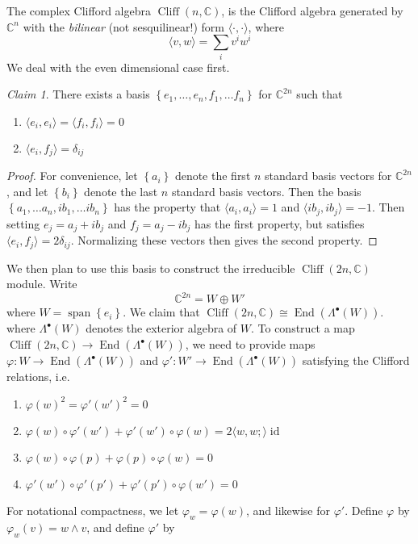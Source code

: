 \documentclass[psamsfonts]{amsart}
\theoremstyle{definition}
\theoremstyle{remark}
\newtheorem*{claim}{Claim}
\newcommand{\C}{\mathbb{C}}
\newcommand{\set}[1]{\left\lbrace #1 \right\rbrace}
\DeclareMathOperator{\id}{id}
\DeclareMathOperator{\End}{End}
\DeclareMathOperator{\Cliff}{Cliff}
\DeclareMathOperator{\spn}{span}
\begin{document}
The complex Clifford algebra $\Cliff(n,\C)$, is the Clifford algebra generated by $\C^n$ with the \emph{bilinear} (not sesquilinear!) form $\langle \cdot, \cdot \rangle$, where
\[
\langle v,w \rangle = \sum_i v^iw^i
\]
We deal with the even dimensional case first.
%
\begin{claim}
There exists a basis $\set{e_1, \ldots, e_n, f_1, \ldots f_n}$ for $\C^{2n}$ such that 
\begin{enumerate}
\item $\langle e_i, e_i \rangle = \langle f_i, f_i \rangle = 0$ 
\item $\langle e_i, f_j \rangle = \delta_{ij}$
\end{enumerate}
\end{claim}
%
\begin{proof}
For convenience, let $\set{a_i}$ denote the first $n$ standard basis vectors for $\C^{2n}$, and let $\set{b_i}$ denote the last $n$ standard basis vectors. Then the basis $\set{a_1, \ldots a_n, ib_1, \ldots ib_n}$ has the property that $\langle a_i, a_i \rangle = 1$ and $\langle ib_j, ib_j \rangle = -1$. Then setting $e_j = a_j + ib_j$ and $f_j = a_j - ib_j$ has the first property, but satisfies $\langle e_i, f_j \rangle = 2\delta_{ij}$. Normalizing these vectors then gives the second property.
\end{proof}
%
We then plan to use this basis to construct the irreducible $\Cliff(2n, \C)$ module. Write 
\[
\C^{2n} = W \oplus W'
\]
where $W = \spn\set{e_i}$. We claim that $\Cliff(2n, \C) \cong \End(\Lambda^\bullet(W))$. where $\Lambda^\bullet(W)$ denotes the exterior algebra of $W$. To construct a map $\Cliff(2n, \C) \to \End(\Lambda^\bullet(W))$, we need to provide maps $\varphi : W \to \End(\Lambda^\bullet(W))$ and $\varphi' : W' \to \End(\Lambda^\bullet(W))$ satisfying the Clifford relations, i.e.
%
\begin{enumerate}
\item $\varphi(w)^2 = \varphi'(w')^2 = 0$
\item $\varphi(w) \circ \varphi'(w') + \varphi'(w') \circ \varphi(w) = 2\langle w,w; \rangle\id $
\item $\varphi(w) \circ \varphi(p) + \varphi(p) \circ \varphi(w) = 0 $
\item $\varphi'(w') \circ \varphi'(p') + \varphi'(p') \circ \varphi(w') = 0$
\end{enumerate}
%
For notational compactness, we let $\varphi_w = \varphi(w)$, and likewise for $\varphi'$. Define $\varphi$ by $\varphi_w(v) = w \wedge v$, and define $\varphi'$ by 
\end{document}
